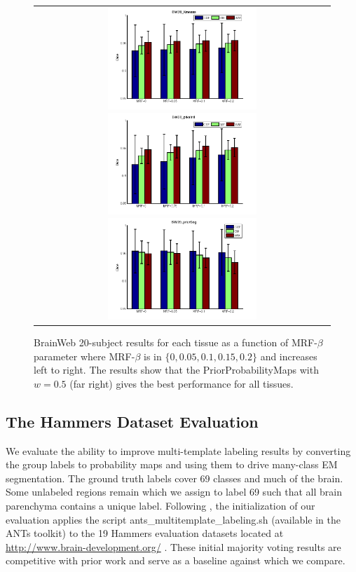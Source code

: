 \documentclass[11pt,english]{article}
\begin{document}
\begin{figure}
\begin{center}
\begin{tabular}{c}
\includegraphics[width=2.2in]{Figures/bw20_kmeans.png}
\includegraphics[width=2.2in]{Figures/bw20_priorIni.png}
\includegraphics[width=2.2in]{Figures/bw20_priorSeg.png}
\end{tabular}
\caption{\baselineskip 12pt \small BrainWeb 20-subject results for
  each tissue as a function of MRF-$\beta$ parameter where MRF-$\beta$
  is in $\{0,0.05,0.1,0.15,0.2\}$ and increases left to right.  The results show that the PriorProbabilityMaps with
  $w=0.5$ (far right) gives the best performance for all tissues.}
\label{fig:bweb20}
\end{center}
\end{figure}



\subsection{The Hammers Dataset Evaluation}
\label{sec:hammers}
We evaluate the ability to improve multi-template labeling results by
converting the group labels to probability maps and using them to
drive many-class EM segmentation.  The ground truth labels cover 69
classes and much of the brain.  Some unlabeled regions remain which we
assign to label 69 such that all brain parenchyma contains a unique
label.  Following \cite{Avants2010a}, the initialization of our
evaluation applies the script {\ttfamily ants\_multitemplate\_labeling.sh }
(available in the ANTs toolkit) to the 19 Hammers evaluation datasets
located at \url{http://www.brain-development.org/}
\citep{Hammers2003,Heckemann2006}.  These initial majority voting
results are competitive with prior work
\citep{Heckemann2006,Heckemann2010} and serve as a baseline against
which we compare.
\end{document}
